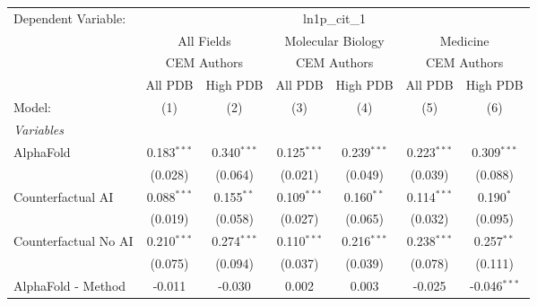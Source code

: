\begingroup
\centering
\begin{tabular}{lcccccc}
   \tabularnewline \midrule \midrule
   Dependent Variable: & \multicolumn{6}{c}{ln1p\_cit\_1}\\
 & \multicolumn{2}{c}{All Fields} & \multicolumn{2}{c}{Molecular Biology} & \multicolumn{2}{c}{Medicine} \\
\cmidrule(lr){2-3} \cmidrule(lr){4-5} \cmidrule(lr){6-7}
 & \multicolumn{2}{c}{CEM Authors} & \multicolumn{2}{c}{CEM Authors} & \multicolumn{2}{c}{CEM Authors} \\
\cmidrule(lr){2-3} \cmidrule(lr){4-5} \cmidrule(lr){6-7}
 & \multicolumn{1}{c}{All PDB} & \multicolumn{1}{c}{High PDB} & \multicolumn{1}{c}{All PDB} & \multicolumn{1}{c}{High PDB} & \multicolumn{1}{c}{All PDB} & \multicolumn{1}{c}{High PDB} \\
\cmidrule(lr){2-2} \cmidrule(lr){3-3} \cmidrule(lr){4-4} \cmidrule(lr){5-5} \cmidrule(lr){6-6} \cmidrule(lr){7-7}
   Model:                                                     & (1)           & (2)           & (3)           & (4)           & (5)           & (6)\\  
   \midrule
   \emph{Variables}\\
   AlphaFold                                                  & 0.183$^{***}$ & 0.340$^{***}$ & 0.125$^{***}$ & 0.239$^{***}$ & 0.223$^{***}$ & 0.309$^{***}$\\   
                                                              & (0.028)       & (0.064)       & (0.021)       & (0.049)       & (0.039)       & (0.088)\\   
   Counterfactual AI                                          & 0.088$^{***}$ & 0.155$^{**}$  & 0.109$^{***}$ & 0.160$^{**}$  & 0.114$^{***}$ & 0.190$^{*}$\\   
                                                              & (0.019)       & (0.058)       & (0.027)       & (0.065)       & (0.032)       & (0.095)\\   
   Counterfactual No AI                                       & 0.210$^{***}$ & 0.274$^{***}$ & 0.110$^{***}$ & 0.216$^{***}$ & 0.238$^{***}$ & 0.257$^{**}$\\   
                                                              & (0.075)       & (0.094)       & (0.037)       & (0.039)       & (0.078)       & (0.111)\\   
   AlphaFold - Method                                         & -0.011        & -0.030        & 0.002         & 0.003         & -0.025        & -0.046$^{***}$\\   

\end{tabular}
